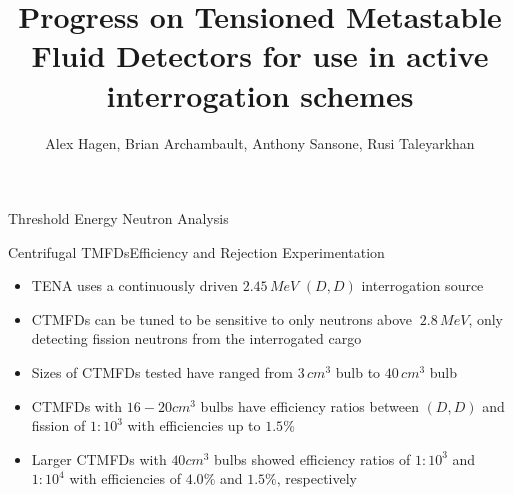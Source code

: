 

\title{Progress on Tensioned Metastable Fluid Detectors for use in active
       interrogation schemes}
\author{Alex Hagen, Brian Archambault,
        Anthony Sansone, Rusi Taleyarkhan}
\renewcommand{\today}{July 3, 2016}
\maketitle%
\hspace*{-1cm}%
\begin{cell}{6}{12}{Threshold Energy Neutron Analysis}{}
  \begin{cell}{4}{3}{Centrifugal TMFDs}{Efficiency and Rejection Experimentation}
    \begin{itemize}
      \item TENA uses a continuously driven $2.45\,MeV$ $\left(D,D\right)$ interrogation source
      \item CTMFDs can be tuned to be sensitive to only neutrons above $~2.8\,MeV$, only detecting fission neutrons from the interrogated cargo
      \item Sizes of CTMFDs tested have ranged from $3\,cm^{3}$ bulb to $40\,cm^{3}$ bulb
      \item CTMFDs with $16 - 20 cm^{3}$ bulbs have efficiency ratios between $\left(D,D\right)$ and fission of $1:10^{3}$ with efficiencies up to $1.5\%$
      \item Larger CTMFDs with $40 cm^{3}$ bulbs showed efficiency ratios of $1:10^{3}$ and $1:10^{4}$ with efficiencies of $4.0\%$ and $1.5\%$, respectively
    \end{itemize}
  \end{cell}%
  \hspace*{\fill}
  \begin{cell}{2}{3}{}{}
  \end{cell} \\
  \vspace*{\fill}
  \begin{cell}{2}{3}{}{}
  \end{cell}
  \hspace*{\fill}

\end{cell}
